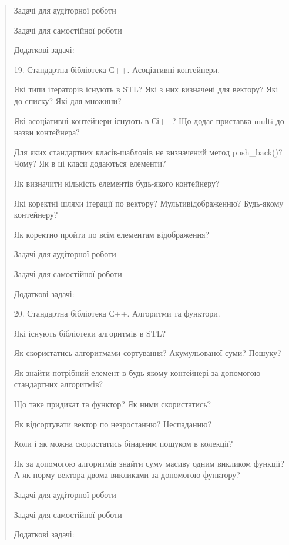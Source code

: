 \documentclass[]{article}
\begin{document}
\begin{quote}
Задачі для аудіторної роботи

Задачі для самостійної роботи

Додаткові задачі:

19. Стандартна бібліотека С++. Асоціативні контейнери.

Які типи ітераторів існують в STL? Які з них визначені для вектору? Які
до списку? Які для множини?

Які асоціативні контейнери існують в Сі++? Що додає приставка multi до
назви контейнера?

Для яких стандартних класів-шаблонів не визначений метод push\_back()?
Чому? Як в ці класи додаються елементи?

Як визначити кількість елементів будь-якого контейнеру?

Які коректні шляхи ітерації по вектору? Мультивідображенню? Будь-якому
контейнеру?

Як коректно пройти по всім елементам відображення?

Задачі для аудіторної роботи

Задачі для самостійної роботи

Додаткові задачі:

20. Стандартна бібліотека С++. Алгоритми та функтори.

Які існують бібліотеки алгоритмів в STL?

Як скористатись алгоритмами сортування? Акумульованої суми? Пошуку?

Як знайти потрібний елемент в будь-якому контейнері за допомогою
стандартних алгоритмів?

Що таке придикат та функтор? Як ними скористатись?

Як відсортувати вектор по незростанню? Неспаданню?

Коли і як можна скористатись бінарним пошуком в колекції?

Як за допомогою алгоритмів знайти суму масиву одним викликом функції? А
як норму вектора двома викликами за допомогою функтору?

Задачі для аудіторної роботи

Задачі для самостійної роботи

Додаткові задачі:
\end{quote}
\end{document}
